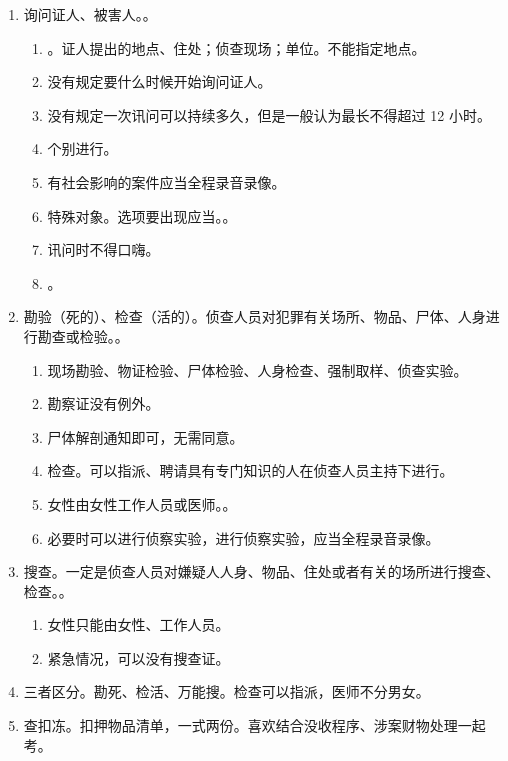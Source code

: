 \begin{enumerate}
  \item 询问证人、被害人。。
        \begin{enumerate}
          \item {}。证人提出的地点、住处；侦查现场；单位。不能指定地点。
          \item 没有规定要什么时候开始询问证人。
          \item 没有规定一次讯问可以持续多久，但是一般认为最长不得超过 12 小时。
          \item 个别进行。
          \item 有社会影响的案件应当全程录音录像。
          \item 特殊对象。选项要出现应当。。
          \item 讯问时不得口嗨。
          \item {}。
        \end{enumerate}
  \item 勘验（死的）、检查（活的）。侦查人员对犯罪有关场所、物品、尸体、人身进行勘查或检验。。
        \begin{enumerate}
          \item 现场勘验、物证检验、尸体检验、人身检查、强制取样、侦查实验。
          \item 勘察证没有例外。
          \item 尸体解剖通知即可，无需同意。
          \item 检查。可以指派、聘请具有专门知识的人在侦查人员主持下进行。
          \item 女性由女性工作人员或医师。。
          \item 必要时可以进行侦察实验，进行侦察实验，应当全程录音录像。
        \end{enumerate}
  \item 搜查。一定是侦查人员对嫌疑人人身、物品、住处或者有关的场所进行搜查、检查。。
        \begin{enumerate}
          \item 女性只能由女性、工作人员。
          \item 紧急情况，可以没有搜查证。
        \end{enumerate}
  \item 三者区分。勘死、检活、万能搜。检查可以指派，医师不分男女。
  \item 查扣冻。扣押物品清单，一式两份。喜欢结合没收程序、涉案财物处理一起考。

\end{enumerate}
